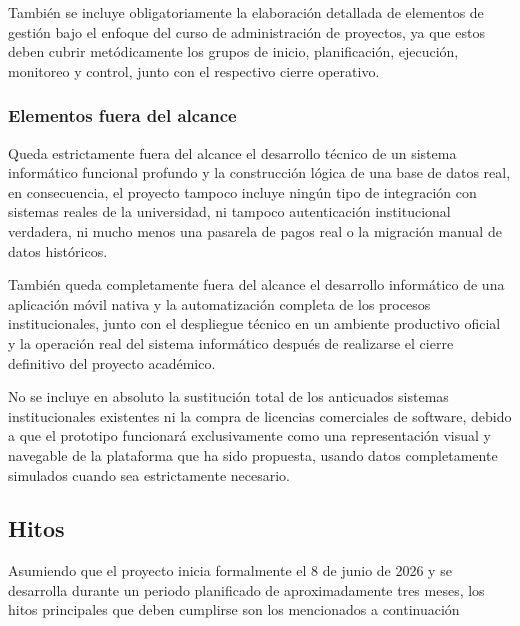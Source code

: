 \documentclass[11pt,spanish]{article}
\begin{document}
También se incluye obligatoriamente la elaboración detallada de elementos de gestión bajo el enfoque del curso de administración de proyectos, ya que estos deben cubrir metódicamente los grupos de inicio, planificación, ejecución, monitoreo y control, junto con el respectivo cierre operativo.

\subsubsection{Elementos fuera del alcance}

Queda estrictamente fuera del alcance el desarrollo técnico de un sistema informático funcional profundo y la construcción lógica de una base de datos real, en consecuencia, el proyecto tampoco incluye ningún tipo de integración con sistemas reales de la universidad, ni tampoco autenticación institucional verdadera, ni mucho menos una pasarela de pagos real o la migración manual de datos históricos.

También queda completamente fuera del alcance el desarrollo informático de una aplicación móvil nativa y la automatización completa de los procesos institucionales, junto con el despliegue técnico en un ambiente productivo oficial y la operación real del sistema informático después de realizarse el cierre definitivo del proyecto académico.

No se incluye en absoluto la sustitución total de los anticuados sistemas institucionales existentes ni la compra de licencias comerciales de software, debido a que el prototipo funcionará exclusivamente como una representación visual y navegable de la plataforma que ha sido propuesta, usando datos completamente simulados cuando sea estrictamente necesario.

\subsection{Hitos}

Asumiendo que el proyecto inicia formalmente el 8 de junio de 2026 y se desarrolla durante un periodo planificado de aproximadamente tres meses, los hitos principales que deben cumplirse son los mencionados a continuación
\end{document}
